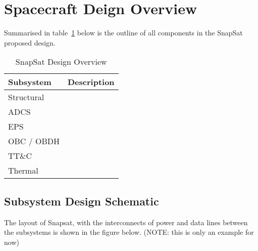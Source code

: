 \section{Spacecraft Deign Overview}
Summarised in table~\ref{tab:designoverview} below is the outline of all components in the SnapSat proposed design.

\begin{table}[H]
    \centering
    \caption{SnapSat Design Overview}
    \vspace{0.15cm}
    \label{tab:designoverview}
    {\renewcommand{\arraystretch}{1.4}%
        \begin{tabular}{|>{\arraybackslash}m{6cm}|>{\arraybackslash}m{9cm}|}
            \hline
            \textbf{Subsystem} & \textbf{Description} \\ \hline\hline
            Structural &  \\\hline
            ADCS &   \\\hline
            EPS &   \\\hline
            OBC / OBDH &   \\\hline
           TT\&C &   \\\hline
           Thermal &   \\\hline
        \end{tabular} } 
    \end{table}
    
\subsection{Subsystem Design Schematic}
The layout of Snapsat, with the interconnects of power and data lines between the subsystems is shown in the figure below. (NOTE: this is only an example for now)

\begin{figure}[H]
\end{figure}
